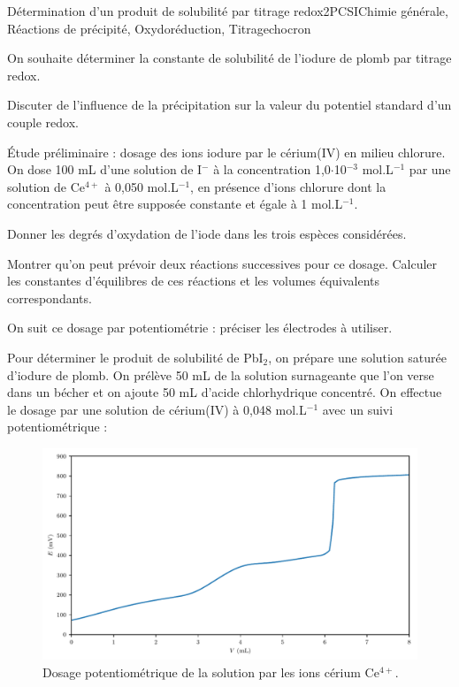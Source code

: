 \begin{exercise}{Détermination d'un produit de solubilité par titrage redox}{2}{PCSI}{Chimie générale, Réactions de précipité, Oxydoréduction, Titrage}{chocron}

On souhaite déterminer la constante de solubilité de l'iodure de plomb par titrage redox.


\begin{questions}
\questioncours Discuter de l'influence de la précipitation sur la valeur du potentiel standard d'un couple redox.


\begin{EnvUplevel}
Étude préliminaire : dosage des ions iodure par le cérium(IV) en milieu chlorure. 
On dose 100 mL d'une solution de I$^-$ à la concentration 1,0$\cdot$10$^{-3}$ mol.L$^{-1}$ par une solution de Ce$^{4+}$ à 0,050 mol.L$^{-1}$, en présence d'ions chlorure dont la concentration peut être supposée constante et égale à 1 mol.L$^{-1}$.

\end{EnvUplevel}

\question Donner les degrés d'oxydation de l'iode dans les trois espèces considérées.

\question Montrer qu'on peut prévoir deux réactions successives pour ce dosage. Calculer les constantes d'équilibres de ces réactions et les volumes équivalents correspondants. 

\question On suit ce dosage par potentiométrie : préciser les électrodes à utiliser. 

\begin{EnvUplevel}
Pour déterminer le produit de solubilité de PbI$_2$, on prépare une solution saturée d'iodure de plomb. On prélève 50 mL de la solution surnageante que l'on verse dans un bécher et on ajoute 50 mL d'acide chlorhydrique concentré.
On effectue le dosage par une solution de cérium(IV) à 0,048 mol.L$^{-1}$ avec un suivi potentiométrique :
\end{EnvUplevel}

\begin{figure}[H]
    \centering
    \includegraphics[width=\linewidth]{chimiePC/gene/dosage_redox.pdf}\vspace{-1em}
    \caption{Dosage potentiométrique de la solution par les ions cérium Ce$^{4+}$.}
\end{figure}


\end{questions}
\end{exercise}
